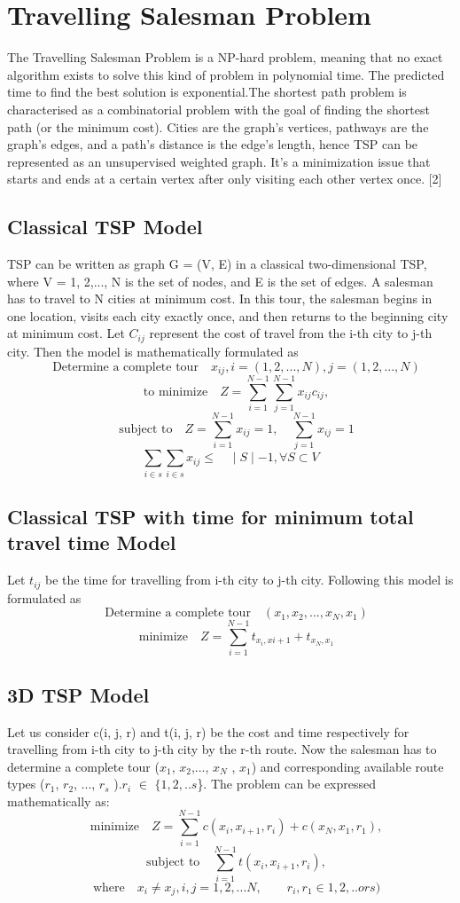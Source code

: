 \documentclass{article}
\begin{document}
\section{Travelling Salesman Problem}
The Travelling Salesman Problem is a NP-hard problem, meaning that no exact algorithm exists to solve this kind of
problem in polynomial time. The predicted time to find the best solution is exponential.The shortest path problem is
characterised as a combinatorial problem with the goal of finding the shortest path (or the minimum cost). Cities are
the graph's vertices, pathways are the graph's edges, and a path's distance is the edge's length, hence TSP can be
represented as an unsupervised weighted graph. It's a minimization issue that starts and ends at a certain vertex after only visiting each other vertex once. [2]

\subsection{Classical TSP Model}
TSP can be written as graph G = (V, E) in a classical two-dimensional TSP, where V = 1, 2,..., N is the set of nodes,
and E is the set of edges. A salesman has to travel to N cities at minimum cost. In this tour, the salesman begins in
one location, visits each city exactly once, and then returns to the beginning city at minimum cost. Let $C_{ij}$ represent
the cost of travel from the i-th city to j-th city. Then the model is mathematically formulated as
\[
\quad \textrm{Determine a complete tour}\quad x_{ij},i=(1,2,...,N),j=(1,2,...,N)
\]
\[
\quad \textrm{to minimize}\quad Z=\sum^{N-1}_{i=1}\sum^{N-1}_{j=1}x_{ij}c_{ij},
\]
\[
\quad \textrm{subject to}\quad Z=\sum^{N-1}_{i=1}x_{ij}=1,\quad \sum^{N-1}_{j=1}x_{ij}=1
\]
\[
\sum_{i\in s}\sum_{i\in s}x_{ij}\le \quad \mid S \mid - 1, \forall S \subset V 
\]

\subsection*{Classical TSP with time for minimum total travel time Model}
Let $t_{ij}$ be the time for travelling from i-th city to j-th city. Following this model is formulated as
\[
\quad \textrm{Determine a complete tour}\quad(x_1,x_2,...,x_N,x_1)
\]
\[
\quad \textrm{minimize}\quad Z=\sum^{N-1}_{i=1} t_{x_i,x{i+1}}+t_{x_N,x_1}
\]

\subsection{3D TSP Model}
Let us consider c(i, j, r) and t(i, j, r) be the cost and time respectively for travelling from i-th city to j-th city by the r-th
route. Now the salesman has to determine a complete tour ($x_1$, $x_2$,..., $x_N$ , $x_1$) and
corresponding available route types ($r_1$, $r_2$, ..., $r_s$ ).$r_i$ $\in$ $\{1, 2, ..s$\}. The problem can be expressed mathematically as:
\[
\quad \textrm{minimize}\quad Z =\sum^{N-1}_{i=1} c(x_i,x_{i+1},r_i)+c(x_N,x_1,r_1), \] 
\[ \quad \textrm{subject to}\quad\sum^{N-1}_{i=1} t(x_i,x_{i+1},r_i),\]
\[
\quad \textrm{where}\quad x_i \ne x_j,i,j=1,2,...N,\quad \textrm{}\quad r_i,r_1 \in 1,2,..ors) 
\]
\end{document}
